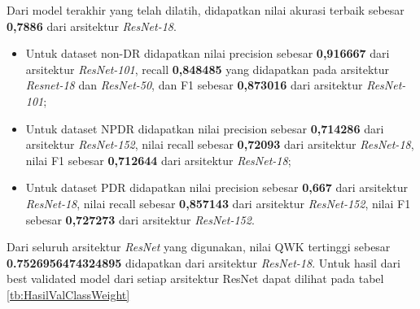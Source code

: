 Dari model terakhir yang telah dilatih, didapatkan nilai akurasi terbaik sebesar \textbf{0,7886} dari arsitektur \emph{ResNet-18}.

\begin{itemize}
	
	\item Untuk dataset non-DR didapatkan nilai precision sebesar \textbf{0,916667} dari arsitektur \emph{ResNet-101}, recall \textbf{0,848485} yang didapatkan pada arsitektur \emph{Resnet-18} dan \emph{ResNet-50}, dan F1 sebesar \textbf{0,873016} dari arsitektur \emph{ResNet-101};
	
	\item Untuk dataset NPDR didapatkan nilai precision sebesar \textbf{0,714286} dari arsitektur \emph{ResNet-152}, nilai recall sebesar \textbf{0,72093} dari arsitektur \emph{ResNet-18}, nilai F1 sebesar \textbf{0,712644} dari arsitektur \emph{ResNet-18};
	
	\item Untuk dataset PDR didapatkan nilai precision sebesar \textbf{0,667} dari arsitektur \emph{ResNet-18}, nilai recall sebesar \textbf{0,857143} dari arsitektur \emph{ResNet-152}, nilai F1 sebesar \textbf{0,727273} dari arsitektur \emph{ResNet-152}.
	
\end{itemize}

Dari seluruh arsitektur \emph{ResNet} yang digunakan, nilai QWK tertinggi sebesar \textbf{0.7526956474324895} didapatkan dari arsitektur \emph{ResNet-18}. Untuk hasil dari best validated model dari setiap arsitektur ResNet dapat dilihat pada tabel \ref{tb:HasilValClassWeight}

\pagebreak

